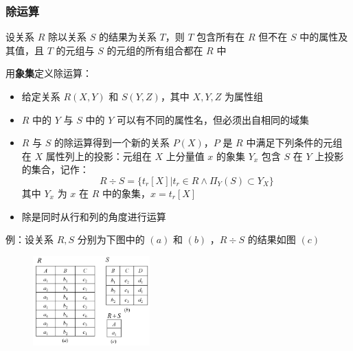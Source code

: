 \subsubsection{除运算}
设关系 $R$ 除以关系 $S$ 的结果为关系 $T$，则 $T$ 包含所有在 $R$ 但不在 $S$ 中的属性及其值，且 $T$ 的元组与 $S$ 的元组的所有组合都在 $R$ 中

用\textbf{象集}定义除运算：
\begin{itemize}
    \item 给定关系 $R(X,Y)$ 和 $S(Y,Z)$，其中 $X,Y,Z$ 为属性组
    \item $R$ 中的 $Y$ 与 $S$ 中的 $Y$ 可以有不同的属性名，但必须出自相同的域集
    \item $R$ 与 $S$ 的除运算得到一个新的关系 $P(X)$，$P$ 是 $R$ 中满足下列条件的元组在 $X$ 属性列上的投影：元组在 $X$ 上分量值 $x$ 的象集 $Y_x$ 包含 $S$ 在 $Y$ 上投影的集合，记作：
    $$R\div S =\{t_r[X] |t_r\in R \wedge \Pi_Y(S) \subset Y_X\}$$
    其中 $Y_x$ 为 $x$ 在 $R$ 中的象集，$x=t_r[X]$
    \item 除是同时从行和列的角度进行运算
\end{itemize}

例：设关系 $R,S$ 分别为下图中的 $(a)$ 和 $(b)$ ，$R\div S$ 的结果如图 $(c)$
\begin{figure}[H]
    \vspace{-0.5em}
	\centering
	\includegraphics[width=0.4\textwidth]{images/2.3.3.4}
    \vspace{-1em}
\end{figure}